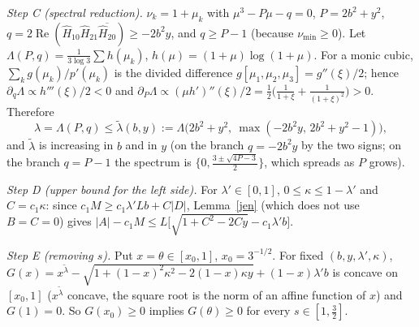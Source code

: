 \documentclass[11pt]{article}
\theoremstyle{remark}\newtheorem{remark}[theorem]{Remark}
\renewcommand{\Re}{\operatorname{Re}}
\begin{document}
\emph{Step C (spectral reduction).}  $\nu_k=1+\mu_k$ with $\mu^3-P\mu-q=0$, $P=2b^2+y^2$, $q=2\Re(\hat H_{10}\hat H_{21}\overline{\hat H_{20}})\ge-2b^2y$,
and $q\ge P-1$ (because $\nu_{\min}\ge0$).  Let $\Lambda(P,q)=\frac1{3\log3}\sum h(\mu_k)$, $h(\mu)=(1+\mu)\log(1+\mu)$.  For a monic cubic,
$\sum_kg(\mu_k)/p'(\mu_k)$ is the divided difference $g[\mu_1,\mu_2,\mu_3]=g''(\xi)/2$; hence
$\partial_q\Lambda\propto h'''(\xi)/2<0$ and $\partial_P\Lambda\propto(\mu h')''(\xi)/2=\frac12\big(\frac1{1+\xi}+\frac1{(1+\xi)^2}\big)>0$.  Therefore
\[\lambda=\Lambda(P,q)\le\tilde\lambda(b,y):=\Lambda\big(2b^2+y^2,\ \max(-2b^2y,\,2b^2+y^2-1)\big),\]
and $\tilde\lambda$ is increasing in $b$ and in $y$ (on the branch $q=-2b^2y$ by the two signs; on the branch $q=P-1$ the spectrum is
$\{0,\frac{3\pm\sqrt{4P-3}}2\}$, which spreads as $P$ grows).

\emph{Step D (upper bound for the left side).}  For $\lambda'\in[0,1]$, $0\le\kappa\le1-\lambda'$ and $C=c_1\kappa$: since $c_1M\ge c_1\lambda'Lb+C|D|$,
Lemma~\ref{jen} (which does not use $B=C=0$) gives $|A|-c_1M\le L\big[\sqrt{1+C^2-2Cy}-c_1\lambda'b\big]$.

\emph{Step E (removing $s$).}  Put $x=\theta\in[x_0,1]$, $x_0=3^{-1/2}$.  For fixed $(b,y,\lambda',\kappa)$,
$G(x)=x^{\tilde\lambda}-\sqrt{1+(1-x)^2\kappa^2-2(1-x)\kappa y}+(1-x)\lambda'b$ is concave on $[x_0,1]$ ($x^{\tilde\lambda}$ concave, the square root is the norm of an
affine function of $x$) and $G(1)=0$.  So $G(x_0)\ge0$ implies $G(\theta)\ge0$ for every $s\in[1,\frac32]$.
\end{document}

